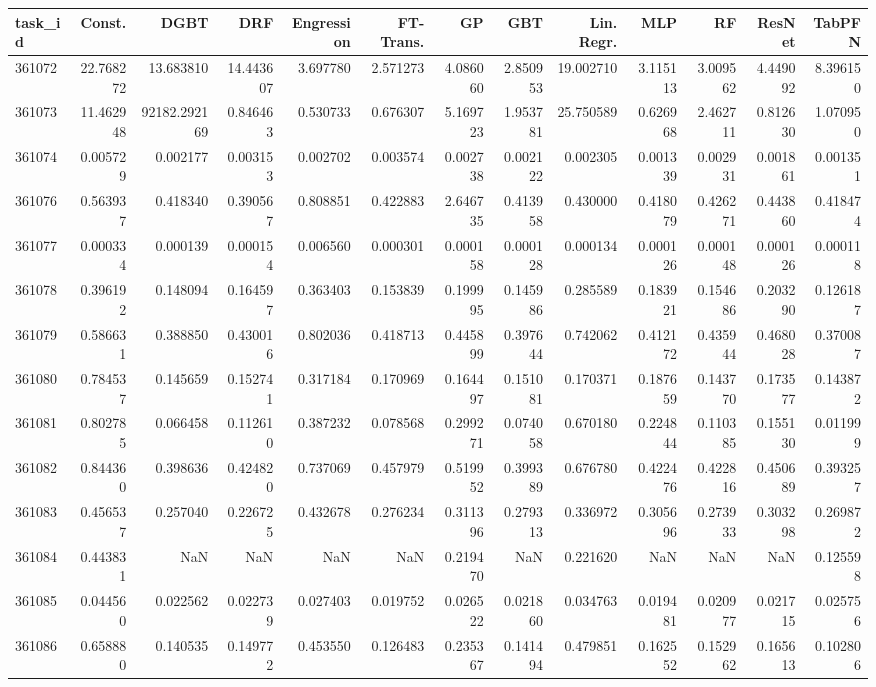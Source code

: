 \begin{tabular}{lrrrrrrrrrrrr}
\toprule
task\_id & Const. & DGBT & DRF & Engression & FT-Trans. & GP & GBT & Lin. Regr. & MLP & RF & ResNet & TabPFN \\
\midrule
361072 & 22.768272 & 13.683810 & 14.443607 & 3.697780 & 2.571273 & 4.086060 & 2.850953 & 19.002710 & 3.115113 & 3.009562 & 4.449092 & 8.396150 \\
361073 & 11.462948 & 92182.292169 & 0.846463 & 0.530733 & 0.676307 & 5.169723 & 1.953781 & 25.750589 & 0.626968 & 2.462711 & 0.812630 & 1.070950 \\
361074 & 0.005729 & 0.002177 & 0.003153 & 0.002702 & 0.003574 & 0.002738 & 0.002122 & 0.002305 & 0.001339 & 0.002931 & 0.001861 & 0.001351 \\
361076 & 0.563937 & 0.418340 & 0.390567 & 0.808851 & 0.422883 & 2.646735 & 0.413958 & 0.430000 & 0.418079 & 0.426271 & 0.443860 & 0.418474 \\
361077 & 0.000334 & 0.000139 & 0.000154 & 0.006560 & 0.000301 & 0.000158 & 0.000128 & 0.000134 & 0.000126 & 0.000148 & 0.000126 & 0.000118 \\
361078 & 0.396192 & 0.148094 & 0.164597 & 0.363403 & 0.153839 & 0.199995 & 0.145986 & 0.285589 & 0.183921 & 0.154686 & 0.203290 & 0.126187 \\
361079 & 0.586631 & 0.388850 & 0.430016 & 0.802036 & 0.418713 & 0.445899 & 0.397644 & 0.742062 & 0.412172 & 0.435944 & 0.468028 & 0.370087 \\
361080 & 0.784537 & 0.145659 & 0.152741 & 0.317184 & 0.170969 & 0.164497 & 0.151081 & 0.170371 & 0.187659 & 0.143770 & 0.173577 & 0.143872 \\
361081 & 0.802785 & 0.066458 & 0.112610 & 0.387232 & 0.078568 & 0.299271 & 0.074058 & 0.670180 & 0.224844 & 0.110385 & 0.155130 & 0.011999 \\
361082 & 0.844360 & 0.398636 & 0.424820 & 0.737069 & 0.457979 & 0.519952 & 0.399389 & 0.676780 & 0.422476 & 0.422816 & 0.450689 & 0.393257 \\
361083 & 0.456537 & 0.257040 & 0.226725 & 0.432678 & 0.276234 & 0.311396 & 0.279313 & 0.336972 & 0.305696 & 0.273933 & 0.303298 & 0.269872 \\
361084 & 0.443831 & NaN & NaN & NaN & NaN & 0.219470 & NaN & 0.221620 & NaN & NaN & NaN & 0.125598 \\
361085 & 0.044560 & 0.022562 & 0.022739 & 0.027403 & 0.019752 & 0.026522 & 0.021860 & 0.034763 & 0.019481 & 0.020977 & 0.021715 & 0.025756 \\
361086 & 0.658880 & 0.140535 & 0.149772 & 0.453550 & 0.126483 & 0.235367 & 0.141494 & 0.479851 & 0.162552 & 0.152962 & 0.165613 & 0.102806 \\

\end{tabular}
